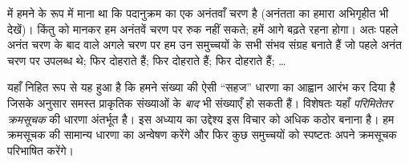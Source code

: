 \documentclass[../../../include/open-logic-section]{subfiles}
\begin{document}


 में हमने \stagesinf{} के रूप में माना था कि पदानुक्रम का
एक अनंतवाँ चरण है (अनंतता का हमारा अभिगृहीत भी देखें)। किंतु
\stagessucc{} को मानकर हम अनंतवें चरण पर रुक नहीं सकते; हमें आगे बढ़ते रहना
होगा। अतः पहले अनंत चरण के बाद वाले अगले चरण पर हम उन समुच्चयों के सभी संभव
संग्रह बनाते हैं जो पहले अनंत चरण पर उपलब्ध थे; फिर दोहराते हैं; फिर
दोहराते हैं; फिर दोहराते हैं; \dots

यहाँ निहित रूप से यह हुआ है कि हमने संख्या की ऐसी ``सहज'' धारणा का आह्वान
आरंभ कर दिया है जिसके अनुसार समस्त प्राकृतिक संख्याओं के \emph{बाद} भी
संख्याएँ हो सकती हैं। विशेषतः यहाँ \emph{परिमितेतर क्रमसूचक} की धारणा
अंतर्भूत है। इस अध्याय का उद्देश्य इस विचार को अधिक कठोर बनाना है। हम
क्रमसूचक की सामान्य धारणा का अन्वेषण करेंगे और फिर कुछ समुच्चयों को स्पष्टतः
अपने क्रमसूचक परिभाषित करेंगे।
\end{document}
